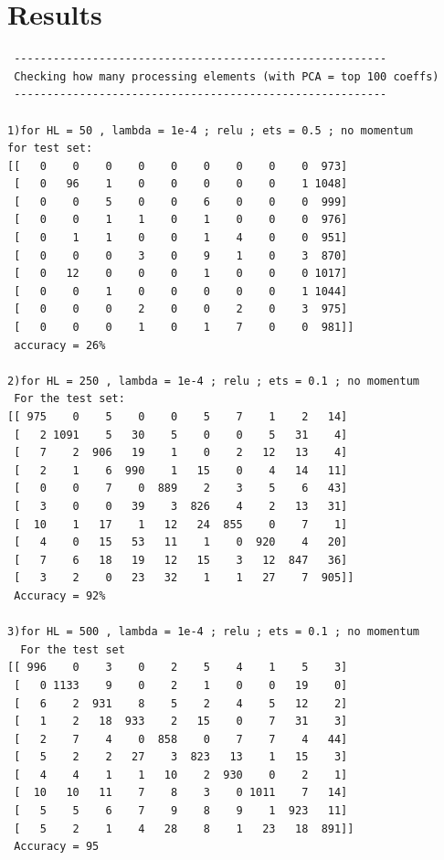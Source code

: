 \documentclass[conference]{IEEEtran}
\begin{document}
\section{Results}
\begin{verbatim}
 ---------------------------------------------------------
 Checking how many processing elements (with PCA = top 100 coeffs)
 ---------------------------------------------------------
 
1)for HL = 50 , lambda = 1e-4 ; relu ; ets = 0.5 ; no momentum 
for test set:
[[   0    0    0    0    0    0    0    0    0  973]
 [   0   96    1    0    0    0    0    0    1 1048]
 [   0    0    5    0    0    6    0    0    0  999]
 [   0    0    1    1    0    1    0    0    0  976]
 [   0    1    1    0    0    1    4    0    0  951]
 [   0    0    0    3    0    9    1    0    3  870]
 [   0   12    0    0    0    1    0    0    0 1017]
 [   0    0    1    0    0    0    0    0    1 1044]
 [   0    0    0    2    0    0    2    0    3  975]
 [   0    0    0    1    0    1    7    0    0  981]] 
 accuracy = 26%

2)for HL = 250 , lambda = 1e-4 ; relu ; ets = 0.1 ; no momentum 
 For the test set:
[[ 975    0    5    0    0    5    7    1    2   14]
 [   2 1091    5   30    5    0    0    5   31    4]
 [   7    2  906   19    1    0    2   12   13    4]
 [   2    1    6  990    1   15    0    4   14   11]
 [   0    0    7    0  889    2    3    5    6   43]
 [   3    0    0   39    3  826    4    2   13   31]
 [  10    1   17    1   12   24  855    0    7    1]
 [   4    0   15   53   11    1    0  920    4   20]
 [   7    6   18   19   12   15    3   12  847   36]
 [   3    2    0   23   32    1    1   27    7  905]]
 Accuracy = 92%

3)for HL = 500 , lambda = 1e-4 ; relu ; ets = 0.1 ; no momentum    
  For the test set
[[ 996    0    3    0    2    5    4    1    5    3]
 [   0 1133    9    0    2    1    0    0   19    0]
 [   6    2  931    8    5    2    4    5   12    2]
 [   1    2   18  933    2   15    0    7   31    3]
 [   2    7    4    0  858    0    7    7    4   44]
 [   5    2    2   27    3  823   13    1   15    3]
 [   4    4    1    1   10    2  930    0    2    1]
 [  10   10   11    7    8    3    0 1011    7   14]
 [   5    5    6    7    9    8    9    1  923   11]
 [   5    2    1    4   28    8    1   23   18  891]]
 Accuracy = 95              
 \end{verbatim}
 \newpage
\end{document}
